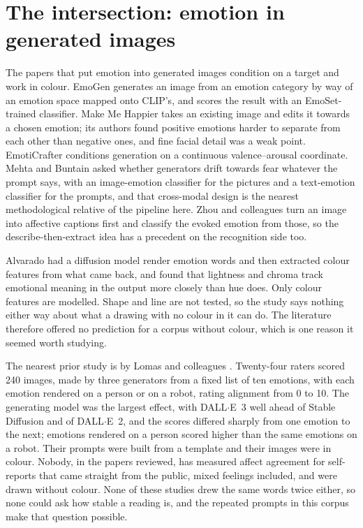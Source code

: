 \section{The intersection: emotion in generated images}
\label{sec:lit-intersection}

The papers that put emotion into generated images condition on a target and work in colour. EmoGen \cite{yang2024emogen} generates an image from an emotion category by way of an emotion space mapped onto CLIP's, and scores the result with an EmoSet-trained classifier. Make Me Happier \cite{lin2024make} takes an existing image and edits it towards a chosen emotion; its authors found positive emotions harder to separate from each other than negative ones, and fine facial detail was a weak point. EmotiCrafter \cite{dang2025emoticrafter} conditions generation on a continuous valence--arousal coordinate. Mehta and Buntain \cite{mehta2024generating} asked whether generators drift towards fear whatever the prompt says, with an image-emotion classifier for the pictures and a text-emotion classifier for the prompts, and that cross-modal design is the nearest methodological relative of the pipeline here. Zhou and colleagues \cite{zhou2025analyzing} turn an image into affective captions first and classify the evoked emotion from those, so the describe-then-extract idea has a precedent on the recognition side too.

Alvarado \cite{alvarado2025texttoimage} had a diffusion model render emotion words and then extracted colour features from what came back, and found that lightness and chroma track emotional meaning in the output more closely than hue does. Only colour features are modelled. Shape and line are not tested, so the study says nothing either way about what a drawing with no colour in it can do. The literature therefore offered no prediction for a corpus without colour, which is one reason it seemed worth studying.

The nearest prior study is by Lomas and colleagues \cite{lomas2024improved}. Twenty-four raters scored 240 images, made by three generators from a fixed list of ten emotions, with each emotion rendered on a person or on a robot, rating alignment from 0 to 10. The generating model was the largest effect, with DALL$\cdot$E~3 well ahead of Stable Diffusion and of DALL$\cdot$E~2, and the scores differed sharply from one emotion to the next; emotions rendered on a person scored higher than the same emotions on a robot. Their prompts were built from a template and their images were in colour. Nobody, in the papers reviewed, has measured affect agreement for self-reports that came straight from the public, mixed feelings included, and were drawn without colour. None of these studies drew the same words twice either, so none could ask how stable a reading is, and the repeated prompts in this corpus make that question possible.

